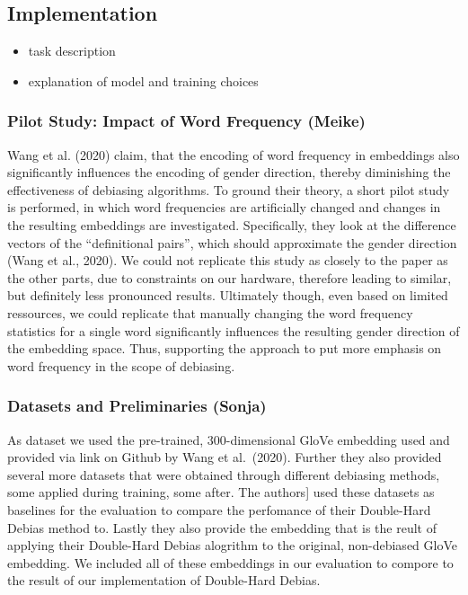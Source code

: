 \documentclass[
  english,
  man,floatsintext]{apa6}
\providecommand{\tightlist}{%
  \setlength{\itemsep}{0pt}\setlength{\parskip}{0pt}}
\begin{document}
\hypertarget{implementation}{%
\subsection{Implementation}\label{implementation}}

\begin{itemize}
\tightlist
\item
  task description
\item
  explanation of model and training choices
\end{itemize}

\hypertarget{pilot-study-impact-of-word-frequency-meike}{%
\subsubsection{Pilot Study: Impact of Word Frequency (Meike)}\label{pilot-study-impact-of-word-frequency-meike}}

Wang et al. (2020) claim, that the encoding of word frequency in embeddings also significantly influences the encoding of gender direction, thereby diminishing the effectiveness of debiasing algorithms. To ground their theory, a short pilot study is performed, in which word frequencies are artificially changed and changes in the resulting embeddings are investigated.
Specifically, they look at the difference vectors of the \enquote{definitional pairs}, which should approximate the gender direction (Wang et al., 2020).
We could not replicate this study as closely to the paper as the other parts, due to constraints on our hardware, therefore leading to similar, but definitely less pronounced results. Ultimately though, even based on limited ressources, we could replicate that manually changing the word frequency statistics for a single word significantly influences the resulting gender direction of the embedding space. Thus, supporting the approach to put more emphasis on word frequency in the scope of debiasing.

\hypertarget{datasets-and-preliminaries-sonja}{%
\subsubsection{Datasets and Preliminaries (Sonja)}\label{datasets-and-preliminaries-sonja}}

As dataset we used the pre-trained, 300-dimensional GloVe embedding used and provided via link on Github by Wang et al.~(2020). Further they also provided several more datasets that were obtained through different debiasing methods, some applied during training, some after. The authors{]} used these datasets as baselines for the evaluation to compare the perfomance of their Double-Hard Debias method to. Lastly they also provide the embedding that is the reult of applying their Double-Hard Debias alogrithm to the original, non-debiased GloVe embedding. We included all of these embeddings in our evaluation to compore to the result of our implementation of Double-Hard Debias.
\end{document}
